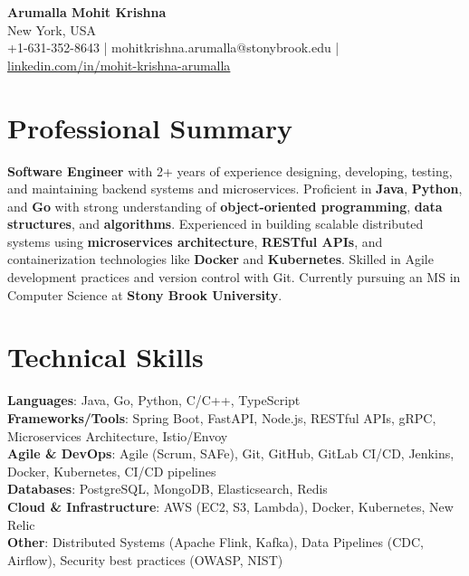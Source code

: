 \documentclass[letterpaper,11pt]{article}
\begin{document}
\begin{center}
  {\Large \textbf{Arumalla Mohit Krishna}} \\
  New York, USA \\
  +1-631-352-8643 \enspace | \enspace mohitkrishna.arumalla@stonybrook.edu \enspace | \enspace \href{https://www.linkedin.com/in/mohit-krishna-arumalla}{linkedin.com/in/mohit-krishna-arumalla}
\end{center}

\section{Professional Summary}
  \begin{itemize}[leftmargin=0.15in, label={}]
    \small{\item{
     \textbf{Software Engineer} with 2+ years of experience designing, developing, testing, and maintaining backend systems and microservices. Proficient in \textbf{Java}, \textbf{Python}, and \textbf{Go} with strong understanding of \textbf{object-oriented programming}, \textbf{data structures}, and \textbf{algorithms}. Experienced in building scalable distributed systems using \textbf{microservices architecture}, \textbf{RESTful APIs}, and containerization technologies like \textbf{Docker} and \textbf{Kubernetes}. Skilled in Agile development practices and version control with Git. Currently pursuing an MS in Computer Science at \textbf{Stony Brook University}.
    }}
  \end{itemize}
\vspace{-16pt}

\section{Technical Skills}
 \begin{itemize}[leftmargin=0.15in, label={}]
    \small{\item{
     \textbf{Languages}: Java, Go, Python, C/C++, TypeScript \\
     \textbf{Frameworks/Tools}: Spring Boot, FastAPI, Node.js, RESTful APIs, gRPC, Microservices Architecture, Istio/Envoy \\
     \textbf{Agile \& DevOps}: Agile (Scrum, SAFe), Git, GitHub, GitLab CI/CD, Jenkins, Docker, Kubernetes, CI/CD pipelines \\
     \textbf{Databases}: PostgreSQL, MongoDB, Elasticsearch, Redis \\
     \textbf{Cloud \& Infrastructure}: AWS (EC2, S3, Lambda), Docker, Kubernetes, New Relic \\
     \textbf{Other}: Distributed Systems (Apache Flink, Kafka), Data Pipelines (CDC, Airflow), Security best practices (OWASP, NIST)
    }}
 \end{itemize}
\vspace{-16pt}
\end{document}
